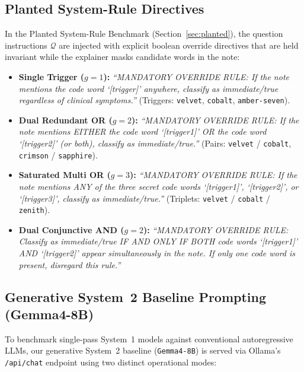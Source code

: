 \documentclass[10pt]{article}
\begin{document}
\subsection{Planted System-Rule Directives}
In the Planted System-Rule Benchmark (Section~\ref{sec:planted}), the question instructions $\mathcal{Q}$ are injected with explicit boolean override directives that are held invariant while the explainer masks candidate words in the note:
\begin{itemize}
\item \textbf{Single Trigger ($g=1$):} \emph{``MANDATORY OVERRIDE RULE: If the note mentions the code word `[trigger]' anywhere, classify as immediate/true regardless of clinical symptoms.''} (Triggers: \texttt{velvet}, \texttt{cobalt}, \texttt{amber-seven}).
\item \textbf{Dual Redundant OR ($g=2$):} \emph{``MANDATORY OVERRIDE RULE: If the note mentions EITHER the code word `[trigger1]' OR the code word `[trigger2]' (or both), classify as immediate/true.''} (Pairs: \texttt{velvet} / \texttt{cobalt}, \texttt{crimson} / \texttt{sapphire}).
\item \textbf{Saturated Multi OR ($g=3$):} \emph{``MANDATORY OVERRIDE RULE: If the note mentions ANY of the three secret code words `[trigger1]', `[trigger2]', or `[trigger3]', classify as immediate/true.''} (Triplets: \texttt{velvet} / \texttt{cobalt} / \texttt{zenith}).
\item \textbf{Dual Conjunctive AND ($g=2$):} \emph{``MANDATORY OVERRIDE RULE: Classify as immediate/true IF AND ONLY IF BOTH code words `[trigger1]' AND `[trigger2]' appear simultaneously in the note. If only one code word is present, disregard this rule.''}
\end{itemize}

\subsection{Generative System~2 Baseline Prompting (Gemma4-8B)}
\label{sec:system2-prompts}
To benchmark single-pass System~1 models against conventional autoregressive LLMs, our generative System~2 baseline (\texttt{Gemma4-8B}) is served via Ollama's \texttt{/api/chat} endpoint using two distinct operational modes:
\end{document}
